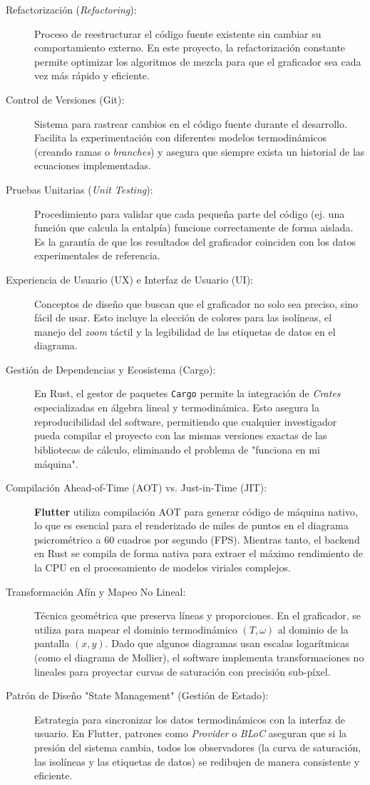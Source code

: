 \begin{description}
        \item[Refactorización (\textit{Refactoring}):] Proceso de reestructurar el código fuente existente sin cambiar su comportamiento externo. En este proyecto, la refactorización constante permite optimizar los algoritmos de mezcla para que el graficador sea cada vez más rápido y eficiente.
        \item[Control de Versiones (Git):] Sistema para rastrear cambios en el código fuente durante el desarrollo. Facilita la experimentación con diferentes modelos termodinámicos (creando ramas o \textit{branches}) y asegura que siempre exista un historial de las ecuaciones implementadas.
        \item[Pruebas Unitarias (\textit{Unit Testing}):] Procedimiento para validar que cada pequeña parte del código (ej. una función que calcula la entalpía) funcione correctamente de forma aislada. Es la garantía de que los resultados del graficador coinciden con los datos experimentales de referencia.
        \item[Experiencia de Usuario (UX) e Interfaz de Usuario (UI):] Conceptos de diseño que buscan que el graficador no solo sea preciso, sino fácil de usar. Esto incluye la elección de colores para las isolíneas, el manejo del \textit{zoom} táctil y la legibilidad de las etiquetas de datos en el diagrama.
        \item[Gestión de Dependencias y Ecosistema (Cargo):] En Rust, el gestor de paquetes \texttt{Cargo} permite la integración de \textit{Crates} especializadas en álgebra lineal y termodinámica. Esto asegura la reproducibilidad del software, permitiendo que cualquier investigador pueda compilar el proyecto con las mismas versiones exactas de las bibliotecas de cálculo, eliminando el problema de "funciona en mi máquina".

        \item[Compilación Ahead-of-Time (AOT) vs. Just-in-Time (JIT):] \textbf{Flutter} utiliza compilación AOT para generar código de máquina nativo, lo que es esencial para el renderizado de miles de puntos en el diagrama psicrométrico a 60 cuadros por segundo (FPS). Mientras tanto, el backend en Rust se compila de forma nativa para extraer el máximo rendimiento de la CPU en el procesamiento de modelos viriales complejos.
        \item[Transformación Afín y Mapeo No Lineal:] Técnica geométrica que preserva líneas y proporciones. En el graficador, se utiliza para mapear el dominio termodinámico $(T, \omega)$ al dominio de la pantalla $(x, y)$. Dado que algunos diagramas usan escalas logarítmicas (como el diagrama de Mollier), el software implementa transformaciones no lineales para proyectar curvas de saturación con precisión sub-píxel.
        \item[Patrón de Diseño "State Management" (Gestión de Estado):] Estrategia para sincronizar los datos termodinámicos con la interfaz de usuario. En Flutter, patrones como \textit{Provider} o \textit{BLoC} aseguran que si la presión del sistema cambia, todos los observadores (la curva de saturación, las isolíneas y las etiquetas de datos) se redibujen de manera consistente y eficiente.


\end{description}
